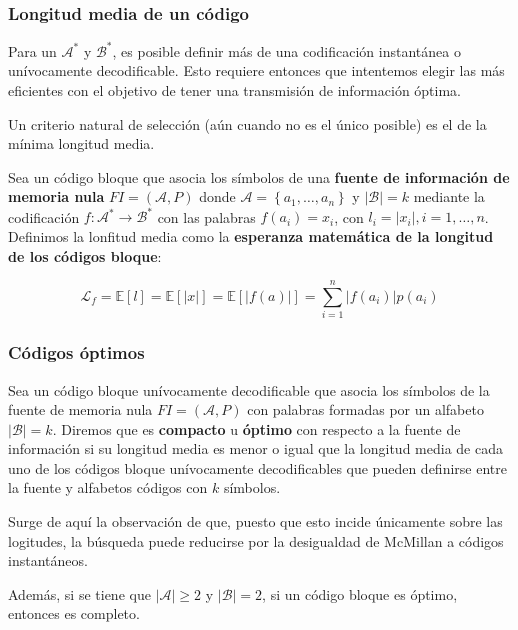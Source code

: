 \subsubsection{Longitud media de un
código}\label{longitud-media-de-un-cuxf3digo}

Para un \(\mathcal{A}^*\) y \(\mathcal{B}^*\), es posible definir más de
una codificación instantánea o unívocamente decodificable. Esto requiere
entonces que intentemos elegir las más eficientes con el objetivo de
tener una transmisión de información óptima.

Un criterio natural de selección (aún cuando no es el único posible) es
el de la mínima longitud media.

Sea un código bloque que asocia los símbolos de una \textbf{fuente de
información de memoria nula} \(FI = \left(\mathcal{A},P\right)\) donde
\(\mathcal{A}=\left\{a_1,\dots,a_n\right\}\) y
\(\left|\mathcal{B}\right|=k\) mediante la codificación
\(f:\mathcal{A}^*\rightarrow\mathcal{B}^*\) con las palabras
\(f\left(a_i\right)=x_i\), con \(l_i=\left|x_i\right|,i=1,\dots,n\).
Definimos la lonfitud media como la \textbf{esperanza matemática de la
longitud de los códigos bloque}:

\[
\mathcal{L}_f=\mathbb{E}\left[l\right]=\mathbb{E}\left[\left|x\right|\right]=\mathbb{E}\left[\left|f(a)\right|\right]=\sum_{i=1}^n \left|f(a_i)\right|p(a_i)
\]

\subsubsection{Códigos óptimos}\label{cuxf3digos-uxf3ptimos}

Sea un código bloque unívocamente decodificable que asocia los símbolos
de la fuente de memoria nula \(FI = \left(\mathcal{A},P\right)\) con
palabras formadas por un alfabeto \(\left|\mathcal{B}\right|=k\).
Diremos que es \textbf{compacto} u \textbf{óptimo} con respecto a la
fuente de información si su longitud media es menor o igual que la
longitud media de cada uno de los códigos bloque unívocamente
decodificables que pueden definirse entre la fuente y alfabetos códigos
con \(k\) símbolos.

Surge de aquí la observación de que, puesto que esto incide únicamente
sobre las logitudes, la búsqueda puede reducirse por la desigualdad de
McMillan a códigos instantáneos.

Además, si se tiene que \(\left|\mathcal{A}\right|\geq 2\) y
\(\left|\mathcal{B}\right| = 2\), si un código bloque es óptimo,
entonces es completo.

